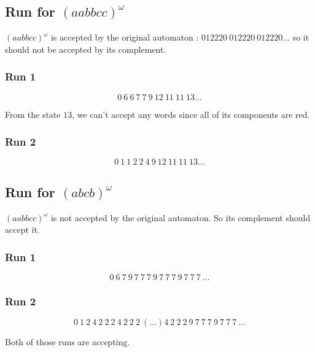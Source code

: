 \documentclass[a4paper,11pt]{report}
\begin{document}
\subsection*{Run for $(aabbcc)^\omega$}

$(aabbcc)^\omega$ is accepted by the original automaton : $012220\ 012220\
012220 \dots$ so it should not be accepted by its complement.

\subsubsection*{Run 1}
\[
  0\ 6\ 6\ 7\ 7\ 9\ 12\ 11\ 11\ 13\dots
\]

From the state $13$, we can't accept any words since all of its components are red.


\subsubsection*{Run 2}
\[
  0\ 1\ 1\ 2\ 2\ 4\ 9\ 12\ 11\ 11\ 13\dots
\]

\subsection*{Run for $(abcb)^\omega$}

$(aabbcc)^\omega$ is not accepted by the original automaton. So its complement
should accept it.

\subsubsection*{Run 1}
\[
  0\ 6\ 7\ 9\ 7\ 7\ 7\ 9\ 7\ 7\ 7\ 9\ 7\ 7\ 7\ \dots
\]

\subsubsection*{Run 2}
\[
  0\ 1\ 2\ 4\ 2\ 2\ 2\ 4\ 2\ 2\ 2\ (\dots) 4\ 2\ 2\ 2\ 9\ 7\ 7\ 7\  9\ 7\ 7\ 7\ \dots
\]

Both of those runs are accepting.
\end{document}

